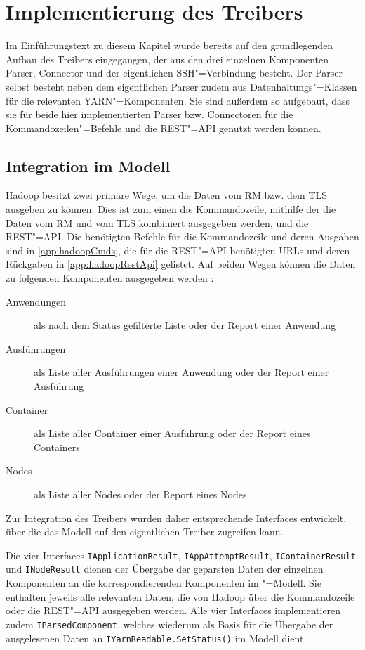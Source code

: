 \section{Implementierung des Treibers}
\label{sec:sshDriver}

Im Einführungstext zu diesem Kapitel wurde bereits auf den grundlegenden Aufbau des Treibers eingegangen, der aus den drei einzelnen Komponenten Parser, Connector und der eigentlichen SSH"=Verbindung besteht.
Der Parser selbst besteht neben dem eigentlichen Parser zudem aus Datenhaltungs"=Klassen für die relevanten YARN"=Komponenten.
Sie sind außerdem so aufgebaut, dass sie für beide hier implementierten Parser bzw. Connectoren für die Kommandozeilen"=Befehle und die REST"=API genutzt werden können.

\subsection{Integration im Modell}
\label{sec:modelIntegration}

Hadoop besitzt zwei primäre Wege, um die Daten vom \ac{RM} bzw. dem \ac{TLS} ausgeben zu können.
Dies ist zum einen die Kommandozeile, mithilfe der die Daten vom \ac{RM} und vom \ac{TLS} kombiniert ausgegeben werden, und die REST"=API.
Die benötigten Befehle für die Kommandozeile und deren Ausgaben sind in \autoref{app:hadoopCmds}, die für die REST"=API benötigten URLs und deren Rückgaben in \autoref{app:hadoopRestApi} gelistet.
Auf beiden Wegen können \uA die Daten zu folgenden Komponenten ausgegeben werden \cite{HadoopYarnTlServer271,HadoopYarnCmds271,HadoopRmApi271,HadoopNmApi271}:

\begin{description}
    \item[Anwendungen] als nach dem Status gefilterte Liste oder der Report einer Anwendung
    \item[Ausführungen] als Liste aller Ausführungen einer Anwendung oder der Report einer Ausführung
    \item[Container] als Liste aller Container einer Ausführung oder der Report eines Containers
    \item[Nodes] als Liste aller Nodes oder der Report eines Nodes
\end{description}

Zur Integration des Treibers wurden daher entsprechende Interfaces entwickelt, über die das Modell auf den eigentlichen Treiber zugreifen kann.

Die vier Interfaces \texttt{IApplicationResult}, \texttt{IAppAttemptResult}, \texttt{IContainerResult} und \texttt{INodeResult} dienen der Übergabe der geparsten Daten der einzelnen Komponenten an die korrespondierenden Komponenten im \sS"=Modell.
Sie enthalten jeweils alle relevanten Daten, die von Hadoop über die Kommandozeile oder die REST"=API ausgegeben werden.
Alle vier Interfaces implementieren zudem \texttt{IParsedComponent}, welches wiederum als Basis für die Übergabe der ausgelesenen Daten an \texttt{IYarnReadable.SetStatus()} im Modell dient.

